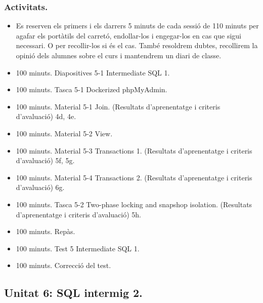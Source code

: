 \documentclass[catalan, a4paper, 12pt, titlepage]{article}
\begin{document}
  \subsubsection{Activitats.}

  \begin{itemize}
          \item Es reserven els primers i els darrers 5 minuts de cada sessió de 110 minuts per agafar els portàtils del carretó, endollar-los i engegar-los en cas que sigui necessari. O per recollir-los si és el cas. També resoldrem dubtes, recollirem la opinió dels alumnes sobre el curs i mantendrem un diari de classe.
	  \item 100 minuts. Diapositives 5-1 Intermediate SQL 1.
	  \item 100 minuts. Tasca 5-1 Dockerized phpMyAdmin.
	  \item 100 minuts. Material 5-1 Join. (\faGraduationCap Resultats d'aprenentatge i criteris d'avaluació) 4d, 4e.
	  \item 100 minuts. Material 5-2 View.
	  \item 100 minuts. Material 5-3 Transactions 1. (\faGraduationCap Resultats d'aprenentatge i criteris d'avaluació) 5f, 5g.
	  \item 100 minuts. Material 5-4 Transactions 2. (\faGraduationCap Resultats d'aprenentatge i criteris d'avaluació) 6g.
	  \item 100 minuts. Tasca 5-2 Two-phase locking and snapshop isolation. (\faGraduationCap Resultats d'aprenentatge i criteris d'avaluació) 5h.
	  \item 100 minuts. Repàs.
	  \item 100 minuts. Test 5 Intermediate SQL 1.
	  \item 100 minuts. Correcció del test.
  \end{itemize}

  \subsection{Unitat 6: SQL intermig 2.}
\end{document}
